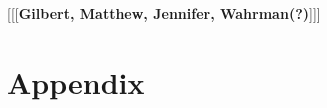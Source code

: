 \documentclass[letterpaper]{article}
\begin{document}
[[[\textbf{Gilbert, Matthew, Jennifer, Wahrman(?)}]]]







\appendix
\onecolumn
\section{Appendix}
\label{sec:appendix}
\end{document}
